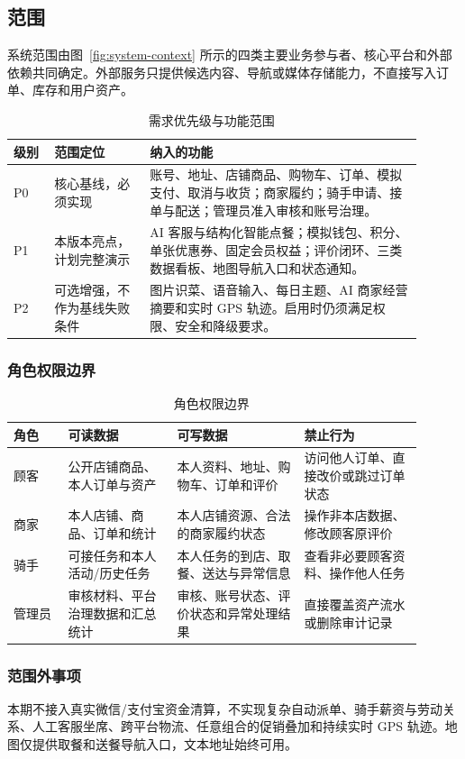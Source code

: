 \subsection{范围}

系统范围由图~\ref{fig:system-context} 所示的四类主要业务参与者、核心平台和外部依赖共同确定。外部服务只提供候选内容、导航或媒体存储能力，不直接写入订单、库存和用户资产。


\begin{longtable}{|L{0.09\linewidth}|L{0.21\linewidth}|L{0.60\linewidth}|}
\caption{需求优先级与功能范围}\label{tab:scope}\\ \hline
\textbf{级别} & \textbf{范围定位} & \textbf{纳入的功能} \\ \hline
P0 & 核心基线，必须实现 & 账号、地址、店铺商品、购物车、订单、模拟支付、取消与收货；商家履约；骑手申请、接单与配送；管理员准入审核和账号治理。 \\ \hline
P1 & 本版本亮点，计划完整演示 & AI 客服与结构化智能点餐；模拟钱包、积分、单张优惠券、固定会员权益；评价闭环、三类数据看板、地图导航入口和状态通知。 \\ \hline
P2 & 可选增强，不作为基线失败条件 & 图片识菜、语音输入、每日主题、AI 商家经营摘要和实时 GPS 轨迹。启用时仍须满足权限、安全和降级要求。 \\ \hline
\end{longtable}

\subsubsection{角色权限边界}

\begin{longtable}{|L{0.12\linewidth}|L{0.24\linewidth}|L{0.28\linewidth}|L{0.26\linewidth}|}
\caption{角色权限边界}\label{tab:role-permission}\\ \hline
\textbf{角色} & \textbf{可读数据} & \textbf{可写数据} & \textbf{禁止行为} \\ \hline
顾客 & 公开店铺商品、本人订单与资产 & 本人资料、地址、购物车、订单和评价 & 访问他人订单、直接改价或跳过订单状态 \\ \hline
商家 & 本人店铺、商品、订单和统计 & 本人店铺资源、合法的商家履约状态 & 操作非本店数据、修改顾客原评价 \\ \hline
骑手 & 可接任务和本人活动/历史任务 & 本人任务的到店、取餐、送达与异常信息 & 查看非必要顾客资料、操作他人任务 \\ \hline
管理员 & 审核材料、平台治理数据和汇总统计 & 审核、账号状态、评价状态和异常处理结果 & 直接覆盖资产流水或删除审计记录 \\ \hline
\end{longtable}

\subsubsection{范围外事项}

本期不接入真实微信/支付宝资金清算，不实现复杂自动派单、骑手薪资与劳动关系、人工客服坐席、跨平台物流、任意组合的促销叠加和持续实时 GPS 轨迹。地图仅提供取餐和送餐导航入口，文本地址始终可用。
